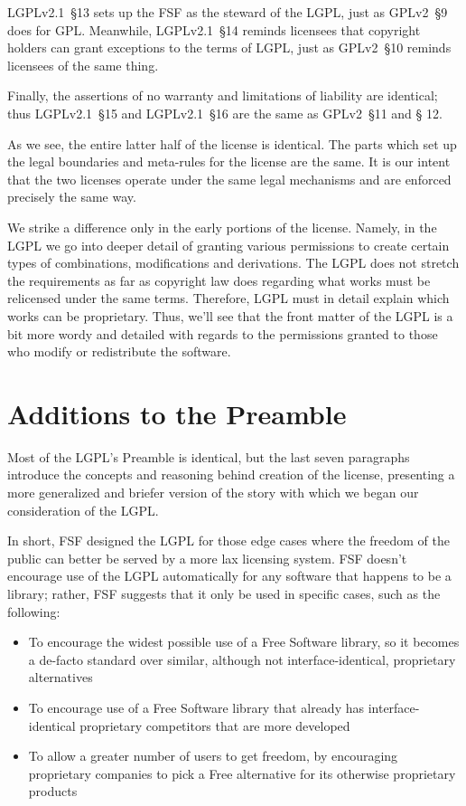 LGPLv2.1~\S13 sets up the FSF as the steward of the LGPL, just as GPLv2~\S9
does for GPL. Meanwhile, LGPLv2.1~\S14 reminds licensees that copyright
holders can grant exceptions to the terms of LGPL, just as GPLv2~\S10
reminds licensees of the same thing.

Finally, the assertions of no warranty and limitations of liability are
identical; thus LGPLv2.1~\S15 and LGPLv2.1~\S16 are the same as GPLv2~\S11 and \S
12.

As we see, the entire latter half of the license is identical.
The parts which set up the legal boundaries and meta-rules for the license
are the same. It is our intent that the two licenses operate under the
same legal mechanisms and are enforced precisely the same way.

We strike a difference only in the early portions of the license.
Namely, in the LGPL we go into deeper detail of granting various permissions to
create certain types of combinations, modifications and derivations.
The LGPL does not stretch the requirements as far as copyright law does regarding what
works must be relicensed under the same terms.  Therefore, LGPL must
in detail explain which works can be proprietary.  Thus, we'll see that the front matter of the LGPL is a
bit more wordy and detailed with regards to the permissions granted to
those who modify or redistribute the software.

\section{Additions to the Preamble}

Most of the LGPL's Preamble is identical, but the last seven paragraphs
introduce the concepts and reasoning behind creation of the license,
presenting a more generalized and briefer version of the story with which
we began our consideration of the LGPL\@.

In short, FSF designed the LGPL for those edge cases where the freedom of the
public can better be served by a more lax licensing system. FSF doesn't
encourage use of the LGPL automatically for any software that happens to be a
library; rather, FSF suggests that it only be used in specific cases, such
as the following:

\begin{itemize}

\item To encourage the widest possible use of a Free Software library, so
  it becomes a de-facto standard over similar, although not
  interface-identical, proprietary alternatives

\item To encourage use of a Free Software library that already has
  interface-identical proprietary competitors that are more developed

\item To allow a greater number of users to get freedom, by encouraging
  proprietary companies to pick a Free alternative for its otherwise
  proprietary products

\end{itemize}


